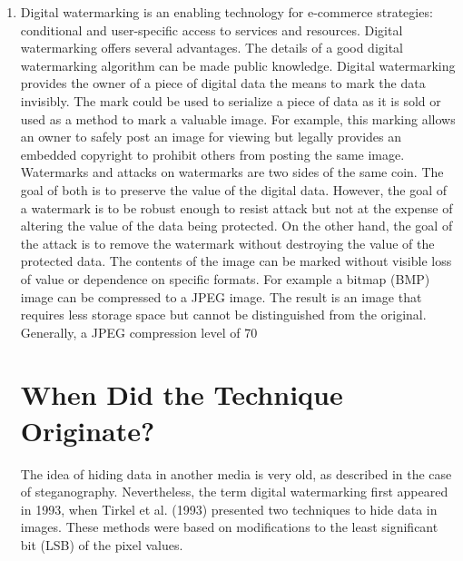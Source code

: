 \documentclass[12pt]{IEEEtran}
\begin{document}
\begin{enumerate}
\item Digital watermarking is an enabling technology for e-commerce strategies: conditional and user-specific access to services and resources. Digital watermarking offers several advantages. The details of a good digital watermarking algorithm can be made public knowledge. Digital watermarking provides the owner of a piece of digital data the means to mark the data invisibly. The mark could be used to serialize a piece of data as it is sold or used as a method to mark a valuable image. For example, this marking allows an owner to safely post an image for viewing but legally provides an embedded copyright to prohibit others from posting the same image. Watermarks and attacks on watermarks are two sides of the same coin. The goal of both is to preserve the value of the digital data. However, the goal of a watermark is to be robust enough to resist attack but not at the expense of altering the value of the data being protected. On the other hand, the goal of the attack is to remove the watermark without destroying the value of the protected data. The contents of the image can be marked without visible loss of value or dependence on specific formats. For example a bitmap (BMP) image can be compressed to a JPEG image. The result is an image that requires less storage space but cannot be distinguished from the original. Generally, a JPEG compression level of 70%
\section*{When Did the Technique Originate?}
The idea of hiding data in another media is very old, as described in the case of steganography. Nevertheless, the term digital watermarking first appeared in 1993, when Tirkel et al. (1993) presented two techniques to hide data in images. These methods were based on modifications to the least significant bit (LSB) of the pixel values.\\

\end{enumerate}
\end{document}
